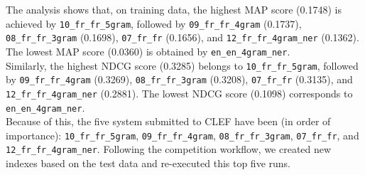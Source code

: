 The analysis shows that, on training data, the highest MAP score (0.1748) is achieved by \texttt{10\_fr\_fr\_5gram},
followed by
\texttt{09\_fr\_fr\_4gram} (0.1737),
\texttt{08\_fr\_fr\_3gram} (0.1698),
\texttt{07\_fr\_fr} (0.1656), and
\texttt{12\_fr\_fr\_4gram\_ner} (0.1362).
The lowest MAP score (0.0360) is obtained by \texttt{en\_en\_4gram\_ner}.\\

Similarly, the highest NDCG score (0.3285) belongs to \texttt{10\_fr\_fr\_5gram}, followed by
\texttt{09\_fr\_fr\_4gram} (0.3269),
\texttt{08\_fr\_fr\_3gram} (0.3208),
\texttt{07\_fr\_fr} (0.3135), and
\texttt{12\_fr\_fr\_4gram\_ner} (0.2881).
The lowest NDCG score (0.1098) corresponds to \texttt{en\_en\_4gram\_ner}.\\

Because of this, the five system submitted to CLEF have been (in order of importance): \texttt{10\_fr\_fr\_5gram},
\texttt{09\_fr\_fr\_4gram}, \texttt{08\_fr\_fr\_3gram}, \texttt{07\_fr\_fr}, and \texttt{12\_fr\_fr\_4gram\_ner}.
Following the competition workflow, we created new indexes based on the test data and re-executed this top five runs.\\

